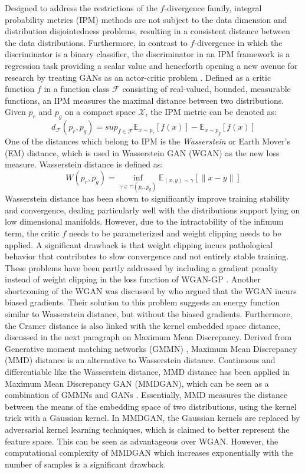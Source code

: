 \label{sec:intprob}
Designed to address the restrictions of the $f$-divergence family, integral probability metrics (IPM) methods are not subject to the data dimension and distribution disjointedness problems, resulting in a consistent distance between the data distributions. Furthermore, in contrast to $f$-divergence in which the discriminator is a binary classifier, the discriminator in an IPM framework is a regression task providing a scalar value and henceforth opening a new avenue for research by treating GANs as an actor-critic problem . Defined as a critic function $f$ in a function class $\mathcal{F}$ consisting of real-valued, bounded, measurable functions, an IPM measures the maximal distance between two distributions. Given $p_{r}$ and $p_{g}$ on a compact space $\mathcal{X}$, the IPM metric can be denoted as:
\begin{equation}
d_{\mathcal{F}}(p_{r}, p_{g}) = sup_{f \in \mathcal{F}}\mathbb{E}_{x \sim p_{r}}[f(x)] - \mathbb{E}_{x \sim p_{g}}[f(x)]
\end{equation}
One of the distances which belong to IPM is the \textit{Wasserstein} or Earth Mover's (EM) distance, which is used in Wasserstein GAN (WGAN)  as the new loss measure. Wasserstein distance is defined as:
\begin{equation}
W(p_{r}, p_{g}) = \inf_{\gamma\in\sqcap(p_{r},p_{g})}\mathbb{E}_{(x,y)\sim\gamma}[\parallel x - y \parallel]
\end{equation}
Wasserstein distance has been shown to significantly improve training stability and convergence, dealing particularly well with the distributions support lying on low dimensional manifolds. However, due to the intractability of the infimum term, the critic $f$ needs to be parameterized and weight clipping needs to be applied. A significant drawback is that weight clipping incurs pathological behavior that contributes to slow convergence and not entirely stable training. These problems have been partly addressed by including a gradient penalty instead of weight clipping in the loss function of WGAN-GP . Another shortcoming of the WGAN was discussed by  who argued that the WGAN incurs biased gradients. Their solution to this problem suggests an energy function similar to Wasserstein distance, but without the biased gradients. Furthermore, the Cramer distance is also linked with the kernel embedded space distance, discussed in the next paragraph on Maximum Mean Discrepancy.
Derived from Generative moment matching networks (GMMN) , Maximum Mean Discrepancy (MMD) distance is an alternative to Wasserstein distance. Continuous and differentiable like the Wasserstein distance, MMD distance has been applied in Maximum Mean Discrepancy GAN (MMDGAN), which can be seen as a combination of GMMNs and GANs . Essentially, MMD measures the distance between the means of the embedding space of two distributions, using the kernel trick with a Gaussian kernel. In MMDGAN, the Gaussian kernels are replaced by adversarial kernel learning techniques, which is claimed to better represent the feature space. This can be seen as advantageous over WGAN. However, the computational complexity of MMDGAN which increases exponentially with the number of samples is a significant drawback.
